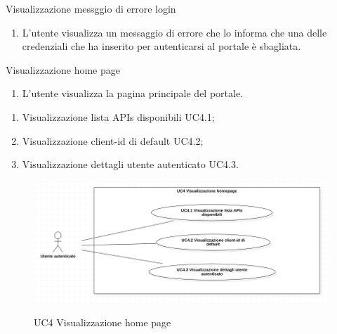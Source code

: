 \begin{usecase}{3}{Visualizzazione messggio di errore login}\label{uc:visualizzazione-errore-login}

    \usecasemain{}
        \begin{enumerate}
            \item L'utente visualizza un messaggio di errore che lo informa che una delle credenziali che ha inserito per autenticarsi al portale è sbagliata.
        \end{enumerate}

\end{usecase}


\begin{usecase}{4}{Visualizzazione home page}\label{uc:visualizzasioen-home-page}

    \usecasemain{}
        \begin{enumerate}
            \item L'utente visualizza la pagina principale del portale.
        \end{enumerate}

    \usecasegen{}
        \begin{enumerate}
            \item Visualizzazione lista APIs disponibili UC4.1;
            \item Visualizzazione client-id di default UC4.2;
            \item Visualizzazione dettagli utente autenticato UC4.3.
        \end{enumerate}

\end{usecase}

\begin{figure}[!ht] 
    \centering 
    \includegraphics[width=0.9\columnwidth, alt={Caso d'uso relativo alla visualizzazione della homepage}]{images/usecase/UC4.jpg}
    \caption{UC4 Visualizzazione home page}\label{fig:uc:visualizzazione-home-page}
  \end{figure}


